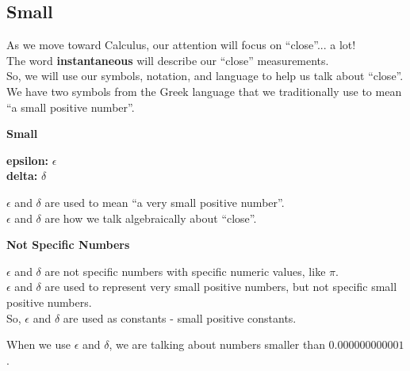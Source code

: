 \documentclass{ximera}
\begin{document}
\subsection*{Small}



As we move toward Calculus, our attention will focus on ``close''... a lot! \\


The word \textbf{instantaneous} will describe our ``close'' measurements. \\


So, we will use our symbols, notation, and language to help us talk about ``close''. \\


We have two symbols from the Greek language that we traditionally use to mean ``a small positive number''. \\



\begin{notation} \textbf{\textcolor{red!80!black}{Small}} 


\textbf{\textcolor{blue!55!black}{epsilon:}}  $\epsilon$ \\

\textbf{\textcolor{blue!55!black}{delta:}}  $\delta$ \\


\end{notation}

$\epsilon$ and $\delta$ are used to mean ``a very small positive number''. \\  


$\epsilon$ and $\delta$ are how we talk algebraically about ``close''. \\





\begin{warning} \textbf{\textcolor{red!80!black}{Not Specific Numbers}} 


$\epsilon$ and $\delta$ are not specific numbers with specific numeric values, like $\pi$. \\


$\epsilon$ and $\delta$ are used to represent very small positive numbers, but not specific small positive numbers. \\


So, $\epsilon$ and $\delta$ are used as constants - small positive constants.


When we use $\epsilon$ and $\delta$, we are talking about numbers smaller than $0.000000000001$. 


\end{warning}
\end{document}
